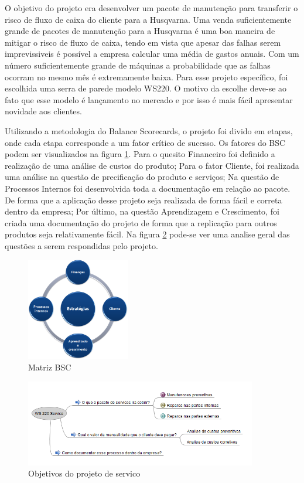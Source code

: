 \documentclass[12pt]{article}
\begin{document}
	O objetivo do projeto era desenvolver um pacote de manutenção para transferir o risco de fluxo de caixa do cliente para a Husqvarna. Uma venda suficientemente grande de pacotes de manutenção para a Husqvarna é uma boa maneira de mitigar o risco de fluxo de caixa, tendo em vista que apesar das falhas serem imprevissiveis é possível a empresa calcular uma média de gastos anuais. Com um número suficientemente grande de máquinas a probabilidade que as falhas ocorram no mesmo mês é extremamente baixa. Para esse projeto específico, foi escolhida uma serra de parede modelo WS220. O motivo da escolhe deve-se ao fato que esse modelo é lançamento no mercado e por isso é mais fácil apresentar novidade aos clientes.

	Utilizando a metodologia do Balance Scorecards, o projeto foi divido em etapas, onde cada etapa corresponde a um fator crítico de sucesso. Os fatores do BSC podem ser visualizados na figura \ref{fig:bsc}. Para o quesito Financeiro foi definido a realização de uma análise de custos do produto; Para o fator Cliente, foi realizada uma análise na questão de precificação do produto e serviços; Na questão de Processos Internos foi desenvolvida toda a documentação em relação ao pacote. De forma que a aplicação desse projeto seja realizada de forma fácil e correta dentro da empresa; Por último, na questão Aprendizagem e Crescimento, foi criada uma documentação do projeto de forma que a replicação para outros produtos seja relativamente fácil. Na figura \ref{fig:service} pode-se ver uma analise geral das questões a serem respondidas pelo projeto.

\begin{figure}[h!]
	\centering
	\includegraphics[width=0.4\textwidth]{img/bsc.png}
	\caption{Matriz BSC}
	\label{fig:bsc}
\end{figure}

\begin{figure}[h!]
	\centering
	\includegraphics[width=0.9\textwidth]{img/ws220.png}
	\caption{Objetivos do projeto de servico}
	\label{fig:service}
\end{figure}
\end{document}
